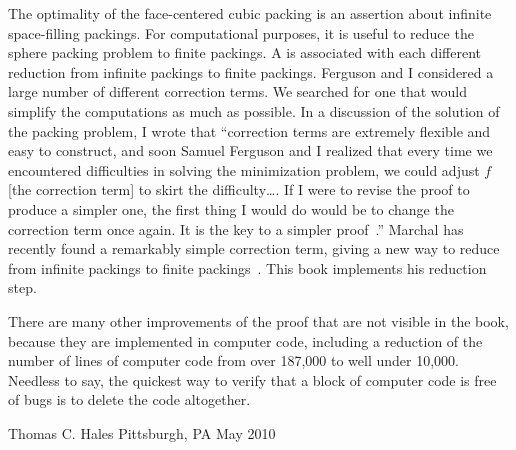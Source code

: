 The optimality of the face-centered cubic packing is an assertion
about infinite space-filling packings.  For computational purposes, it is
useful to reduce the sphere packing problem to finite packings.  A
 is associated with each different reduction from
infinite packings to finite packings.  Ferguson and I considered a
large number of different correction terms.  We searched for one that
would simplify the computations as much as possible.  In a discussion
of the solution of the packing problem, I wrote that ``correction
terms are extremely flexible and easy to construct, and soon Samuel
Ferguson and I realized that every time we encountered difficulties in
solving the minimization problem, we could adjust $f$ [the correction
term] to skirt the difficulty\dots.  If I were to revise the proof
to produce a simpler one, the first thing I would do would be to
change the correction term once again.  It is the key to a simpler
proof~\cite{Hales:2000:cannonballs}.''  Marchal has recently found a remarkably simple 
correction term, giving a new way  to  reduce from infinite packings
to finite packings~\cite{marchal:2009}.  This book implements his reduction step.

There are many other improvements of the proof that are not visible in
the book, because they are implemented in computer code, including
a reduction of  the number of lines of computer code from over 187,000
to well under 10,000.  Needless to say, the quickest way to verify that a block
 of computer code is free of bugs is to delete the code altogether.




\bigskip
\hbox{}



\bigskip
\hbox{}

{
\parindent=0pt
\obeylines

Thomas C. Hales
Pittsburgh, PA
May 2010

}







